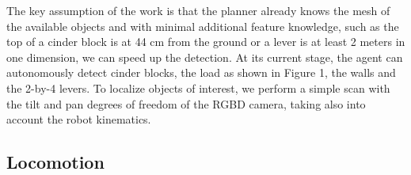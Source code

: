 \documentclass[runningheads,a4paper]{llncs}
\begin{document}
The key assumption of the work is that the planner already knows the mesh of the available objects
and with minimal additional feature knowledge, such as the top of a cinder block is at 44 cm from
the ground or a lever is at least 2 meters in one dimension, we can speed up the detection. At its
current stage, the agent can autonomously detect cinder blocks, the load as shown in Figure 1, the
walls and the 2-by-4 levers. To localize objects of interest, we perform a simple scan with the tilt
and pan degrees of freedom of the RGBD camera, taking also into account the robot kinematics.

\subsection{Locomotion}



\newpage


\end{document}
